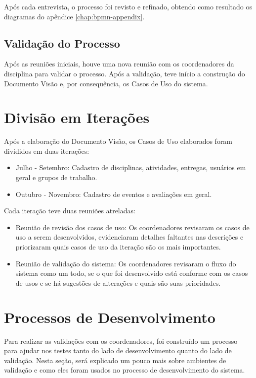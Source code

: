 Após cada entrevista, o processo foi revisto e refinado, obtendo como resultado os diagramas do apêndice \ref{chap:bpmn-appendix}.

\subsection{Validação do Processo}
Após as reuniões iniciais, houve uma nova reunião com os coordenadores da disciplina para validar o processo. Após a validação, teve início a construção do Documento Visão e, por consequência, os Casos de Uso do sistema.

\section{Divisão em Iterações}
Após a elaboração do Documento Visão, os Casos de Uso elaborados foram divididos em duas iterações:

\begin{itemize}
    \item Julho - Setembro: Cadastro de disciplinas, atividades, entregas, usuários em geral e grupos de trabalho.
    \item Outubro - Novembro: Cadastro de eventos e avaliações em geral.
\end{itemize}

Cada iteração teve duas reuniões atreladas:
\begin{itemize}
    \item Reunião de revisão dos casos de uso: Os coordenadores revisaram os casos de uso a serem desenvolvidos, evidenciaram detalhes faltantes nas descrições e priorizaram quais casos de uso da iteração são os mais importantes.
    \item Reunião de validação do sistema: Os coordenadores revisaram o fluxo do sistema como um todo, se o que foi desenvolvido está conforme com os casos de usos e se há sugestões de alterações e quais são suas prioridades.
\end{itemize}

\section{Processos de Desenvolvimento}
Para realizar as validações com os coordenadores, foi construído um processo para ajudar nos testes tanto do lado de desenvolvimento quanto do lado de validação. Nesta seção, será explicado um pouco mais sobre ambientes de validação e como eles foram usados no processo de desenvolvimento do sistema.

